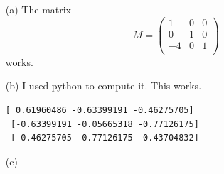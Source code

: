 \documentclass[10pt]{article}
\begin{document}
\begin{enumerate}

\item[(a)] The matrix $$M = \begin{pmatrix}
1  & 0 & 0 \\
 0 & 1 & 0 \\
 -4 & 0 & 1 \\
\end{pmatrix}$$ works.

\item[(b)] I used python to compute it. This works.

\begin{verbatim}
[ 0.61960486 -0.63399191 -0.46275705]
 [-0.63399191 -0.05665318 -0.77126175]
 [-0.46275705 -0.77126175  0.43704832]

\end{verbatim}

\item[(c)]

\end{enumerate}

\end{document}
